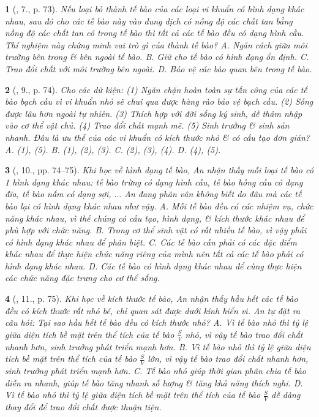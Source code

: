 \documentclass{article}
\newtheorem{baitoan}{}
\begin{document}
\begin{baitoan}[\cite{ncpt_KHTN_6_tap_1}, 7., p. 73]
	Nếu loại bỏ thành tế bào của các loại vi khuẩn có hình dạng khác nhau, sau đó cho các tế bào này vào dung dịch có nồng độ các chất tan bằng nồng độ các chất tan có trong tế bào thì tất cả các tế bào đều có dạng hình cầu. Thí nghiệm này chứng minh vai trò gì của thành tế bào? {\sf A.} Ngăn cách giữa môi trường bên trong \& bên ngoài tế bào. {\sf B.} Giữ cho tế bào có hình dạng ổn định. {\sf C.} Trao đổi chất với môi trường bên ngoài. {\sf D.} Bảo vệ các bào quan bên trong tế bào.
\end{baitoan}

\begin{baitoan}[\cite{ncpt_KHTN_6_tap_1}, 9., p. 74]
	Cho các dữ kiện: (1) Ngăn chặn hoàn toàn sự tấn công của các tế bào bạch cầu vì vi khuẩn nhỏ sẽ chui qua được hàng rào bảo vệ bạch cầu. (2) Sống được lâu hơn ngoài tự nhiên. (3) Thích hợp với đời sống ký sinh, dễ thâm nhập vào cơ thể vật chủ. (4) Trao đổi chất mạnh mẽ. (5) Sinh trưởng \& sinh sản nhanh. Đâu là ưu thế của các vi khuẩn có kích thước nhỏ \& có cấu tạo đơn giản? {\sf A.} (1), (5). {\sf B.} (1), (2), (3). {\sf C.} (2), (3), (4). {\sf D.} (4), (5).
\end{baitoan}

\begin{baitoan}[\cite{ncpt_KHTN_6_tap_1}, 10., pp. 74--75]
	Khi học về hình dạng tế bào, An nhận thấy mỗi loại tế bào có 1 hình dạng khác nhau: tế bào trừng có dạng hình cầu, tế bào hồng cầu có dạng đĩa, tế bào nấm có dạng sợi, $\ldots$ An đang phân vân không biết do đâu mà các tế bào lại có hình dạng khác nhau như vậy. {\sf A.} Mỗi tế bào đều có các nhiệm vụ, chức năng khác nhau, vì thế chúng có cấu tạo, hình dạng, \& kích thước khác nhau để phù hợp với chức năng. {\sf B.} Trong cơ thể sinh vật có rất nhiều tế bào, vì vậy phải có hình dạng khác nhau để phân biệt. {\sf C.} Các tế bào cần phải có các đặc điểm khác nhau để thực hiện chức năng riêng của mình nên tất cả các tế bào phải có hình dạng khác nhau. {\sf D.} Các tế bào có hình dạng khác nhau để cùng thực hiện các chức năng đặc trưng cho cơ thể sống.
\end{baitoan}

\begin{baitoan}[\cite{ncpt_KHTN_6_tap_1}, 11., p. 75]
	Khi học về kích thước tế bào, An nhận thấy hầu hết các tế bào đều có kích thước rất nhỏ bé, chỉ quan sát được dưới kính hiển vi. An tự đặt ra câu hỏi: Tại sao hầu hết tế bào đều có kích thước nhỏ? {\sf A.} Vì tế bào nhỏ thì tỷ lệ giữa diện tích bề mặt trên thể tích của tế bào $\frac{S}{V}$ nhỏ, vì vậy tế bào trao đổi chất nhanh hơn, sinh trưởng phát triển mạnh hơn. {\sf B.} Vì tế bào nhỏ thì tỷ lệ giữa diện tích bề mặt trên thể tích của tế bào $\frac{S}{V}$ lớn, vì vậy tế bào trao đổi chất nhanh hơn, sinh trưởng phát triển mạnh hơn. {\sf C.} Tế bào nhỏ giúp thời gian phân chia tế bào diễn ra nhanh, giúp tế bào tăng nhanh số lượng \& tăng khả năng thích nghi. {\sf D.} Vì tế bào nhỏ thì tỷ lệ giữa diện tích bề mặt trên thể tích của tế bào $\frac{S}{V}$ dễ dàng thay đổi để trao đổi chất được thuận tiện.
\end{baitoan}
\end{document}
